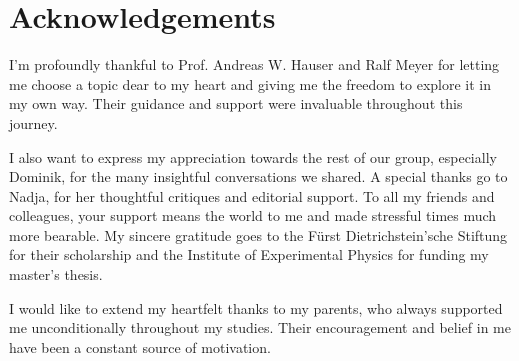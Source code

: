 \chapter*{Acknowledgements}
\label{chap:acknowledgements}

I'm profoundly thankful to Prof. Andreas W. Hauser and Ralf Meyer for letting me choose a topic dear to my heart and giving me the freedom to explore it in my own way. Their guidance and support were invaluable throughout this journey.

I also want to express my appreciation towards the rest of our group, especially Dominik, for the many insightful conversations we shared. A special thanks go to Nadja, for her thoughtful critiques and editorial support. To all my friends and colleagues, your support means the world to me and made stressful times much more bearable. My sincere gratitude goes to the Fürst Dietrichstein'sche Stiftung for their scholarship and the Institute of Experimental Physics for funding my master's thesis.

I would like to extend my heartfelt thanks to my parents, who always supported me unconditionally throughout my studies. Their encouragement and belief in me have been a constant source of motivation. 